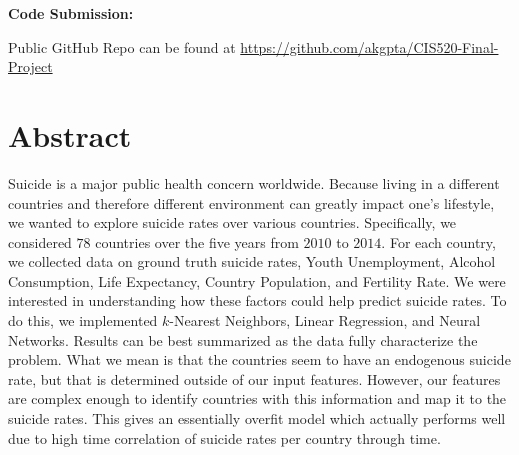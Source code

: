 \documentclass{article}
\begin{document}
\vspace{12pt}

\textbf{Code Submission:}

\normalsize{Public GitHub Repo can be found at \href{https://github.com/akgpta/CIS520-Final-Project}{https://github.com/akgpta/CIS520-Final-Project}}



\newpage
\tableofcontents
\newpage

\section{Abstract}
Suicide is a major public health concern worldwide. Because living in a different countries and therefore different environment can greatly impact one's lifestyle, we wanted to explore suicide rates over various countries. Specifically, we considered $78$ countries over the five years from $2010$ to $2014$. For each country, we collected data on ground truth suicide rates, Youth Unemployment, Alcohol Consumption, Life Expectancy, Country Population, and Fertility Rate. We were interested in understanding how these factors could help predict suicide rates. To do this, we implemented $k$-Nearest Neighbors, Linear Regression, and Neural Networks. Results can be best summarized as the data fully characterize the problem. What we mean is that the countries seem to have an endogenous suicide rate, but that is determined outside of our input features. However, our features are complex enough to identify countries with this information and map it to the suicide rates. This gives an essentially overfit model which actually performs well due to high time correlation of suicide rates per country through time. 
\end{document}
